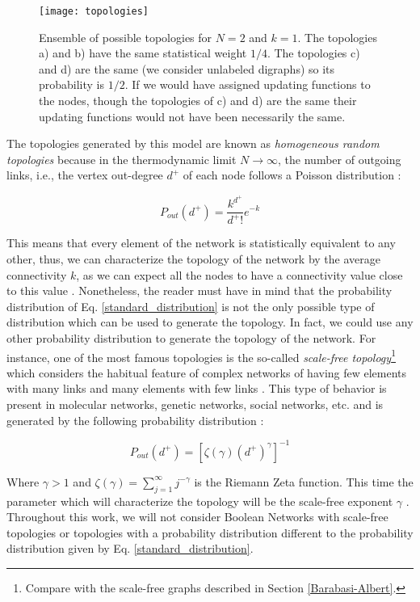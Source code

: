 \begin{figure}
	\centering
		\texttt{[image: topologies]}
	\caption[An ensemble of possible topologies for a Random Boolean Network.]{Ensemble of possible topologies for $N=2$ and $k=1$. The topologies a) and b) have the same statistical weight $1/4$. The topologies c) and d) are the same (we consider unlabeled digraphs) so its probability is $1/2$. If we would have assigned updating functions to the nodes, though the topologies of c) and d) are the same their updating functions would not have been necessarily the same.}
	\label{fig:topologies}
\end{figure}

The topologies generated by this model are known as \textit{homogeneous random topologies} because in the thermodynamic limit $N \rightarrow \infty$, the number of outgoing links, i.e., the vertex out-degree $ d^{+}$ of each node follows a Poisson distribution \cite{rbn_barbara}:

\begin{equation}
\label{standard_distribution}
  P_{out}(d^{+})=\frac{k^{d^{+}}}{d^{+} !} e^{-k}
\end{equation}

This means that every element of the network is statistically equivalent to any other, thus, we can characterize the topology of the network by the average connectivity $k$, as we can expect all the nodes to have a connectivity value close to this value \cite{rbn_aldana}. Nonetheless, the reader must have in mind that the probability distribution of Eq. \ref{standard_distribution} is not the only possible type of distribution which can be used to generate the topology. In fact, we could use any other probability distribution to generate the topology of the network. For instance, one of the most famous topologies is the so-called \textit{scale-free topology}\footnote{Compare with the scale-free graphs described in Section \ref{Barabasi-Albert}.} which considers the habitual feature of complex networks of having few elements with many links and many elements with few links \cite{rbn_carlos}. This type of behavior is present in molecular networks, genetic networks, social networks, etc. and is generated by the following probability distribution \cite{rbn_aldana}:

\begin{equation}
  P_{out}(d^{+})=[\zeta (\gamma) (d^{+})^{\gamma} ]^{-1}
\end{equation}

Where $\gamma >1$ and $\zeta (\gamma)= \sum_{j=1}^{\infty} j^{-\gamma}$ is the Riemann Zeta function. This time the parameter which will characterize the topology will be the scale-free exponent $\gamma$ \cite{rbn_aldana}. Throughout this work, we will not consider Boolean Networks with scale-free topologies or topologies with a probability distribution different to the probability distribution given by Eq. \ref{standard_distribution}.

